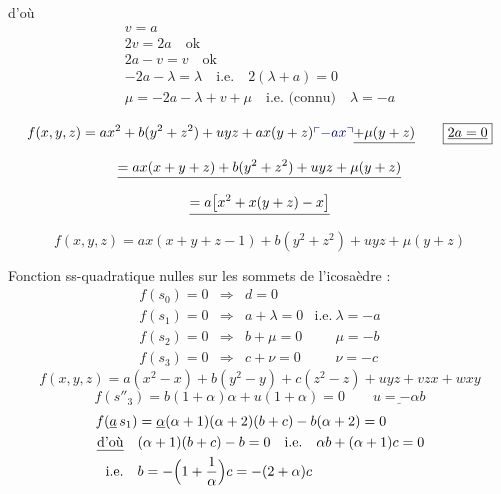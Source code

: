 \documentclass[11pt,a4paper]{article}
\begin{document}
d'où
\begin{gather*}
\boxed{v = a} \\
2v = 2a \quad \text{ok} \\
2a - v = v \quad \text{ok} \\
-2a - \lambda = \lambda \quad \text{i.e.} \quad \boxed{2(\lambda + a) = 0} \\
\mu = -2a - \lambda + v + \mu \quad \text{i.e.\ (connu)} \quad \boxed{\lambda = -a}
\end{gather*}


\[ f(x, y, z) = ax^2 + b(y^2 + z^2) + uyz + ax(y + z) \add{- ax} \struck{+ \mu(y + z)} \qquad \boxed{\uncertain{2a = 0}} \]
\[ \struck{= ax(x + y + z) + b(y^2 + z^2) + uyz + \mu(y + z)} \]
\[ \struck{= a\bigl[x^2 + x(y + z) - x\bigr]} \]
\[ f(x, y, z) = ax(x + y + z - 1) + b(y^2 + z^2) + uyz + \mu(y + z) \]

Fonction ss-quadratique nulles sur les sommets de l'icosaèdre :
\[ \begin{array}{lcll}
f(s_0) = 0 & \Longrightarrow & d = 0 & \\
f(s_1) = 0 & \Longrightarrow & a + \lambda = 0 & \text{i.e.}\ \lambda = -a \\
f(s_2) = 0 & \Longrightarrow & b + \mu = 0 & \phantom{\text{i.e.}}\ \mu = -b \\
f(s_3) = 0 & \Longrightarrow & c + \nu = 0 & \phantom{\text{i.e.}}\ \nu = -c
\end{array} \]
\[ f(x, y, z) = a(x^2 - x) + b(y^2 - y) + c(z^2 - z) + uyz + vzx + wxy \]
\[ f(s''_3) = b(1+\alpha)\alpha + u(1+\alpha) = 0 \qquad \underline{u = -\alpha b} \]
\begin{align*}
f(\underline{a}\,s_1) &= \uncertain{\alpha}(\alpha+1)(\alpha+2)(b + c) - b(\alpha + 2) = 0 \\
\text{\uncertain{d'où}}\quad & (\alpha+1)(b + c) - b = 0 \quad \text{i.e.} \quad \alpha b + (\alpha+1)c = 0 \\
\text{i.e.}\quad & b = -\Bigl(1 + \frac{1}{\alpha}\Bigr)c = -(2 + \alpha)c
\end{align*}
\end{document}
